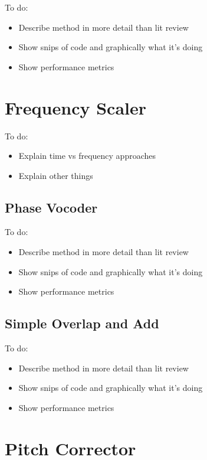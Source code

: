\color{red}
To do:
\begin{itemize}
	\item Describe method in more detail than lit review
	\item Show snips of code and graphically what it's doing
	\item Show performance metrics
\end{itemize}
\color{black}

\section{Frequency Scaler}

\color{red}
To do:
\begin{itemize}
	\item Explain time vs frequency approaches
	\item Explain other things
\end{itemize}
\color{black}

\subsection{Phase Vocoder}

\color{red}
To do:
\begin{itemize}
	\item Describe method in more detail than lit review
	\item Show snips of code and graphically what it's doing
	\item Show performance metrics
\end{itemize}
\color{black}

\subsection{Simple Overlap and Add}

\color{red}
To do:
\begin{itemize}
	\item Describe method in more detail than lit review
	\item Show snips of code and graphically what it's doing
	\item Show performance metrics
\end{itemize}
\color{black}

\section{Pitch Corrector}

